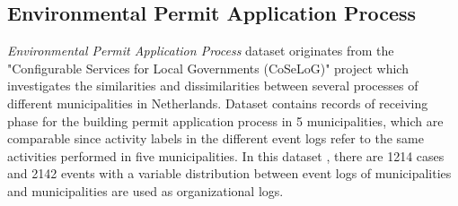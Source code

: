 \subsection{Environmental Permit Application Process}
\label{subsec:coselog-wabo-process}
\textit{Environmental Permit Application Process} dataset originates from the "Configurable Services for Local Governments (CoSeLoG)" project \cite{van2011business} which investigates the similarities and dissimilarities between several processes of different municipalities in Netherlands. Dataset contains records of receiving phase for the building permit application process in 5 municipalities, which are comparable since activity labels in the different event logs refer to the same activities performed in five municipalities. In this dataset \cite{coselog-data}, there are 1214 cases and 2142 events with a variable distribution between event logs of municipalities and municipalities are used as organizational logs.

